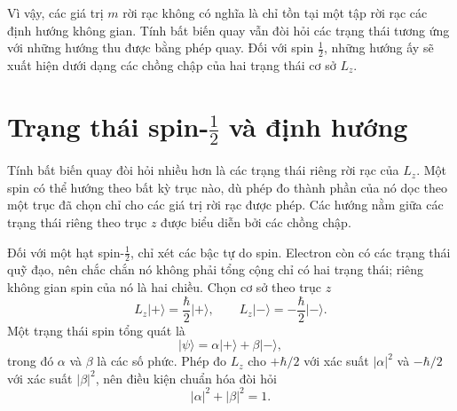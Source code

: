 \begin{classroomqa}
\end{classroomqa}

Vì vậy, các giá trị \(m\) rời rạc không có nghĩa là chỉ tồn tại một tập rời rạc các định hướng không gian. Tính bất biến quay vẫn đòi hỏi các trạng thái tương ứng với những hướng thu được bằng phép quay. Đối với spin \(\tfrac12\), những hướng ấy sẽ xuất hiện dưới dạng các chồng chập của hai trạng thái cơ sở \(L_z\).

\section{Trạng thái spin-\texorpdfstring{\(\tfrac12\)}{1/2} và định hướng}

Tính bất biến quay đòi hỏi nhiều hơn là các trạng thái riêng rời rạc của \(L_z\). Một spin có thể hướng theo bất kỳ trục nào, dù phép đo thành phần của nó dọc theo một trục đã chọn chỉ cho các giá trị rời rạc được phép. Các hướng nằm giữa các trạng thái riêng theo trục \(z\) được biểu diễn bởi các chồng chập.

Đối với một hạt spin-\(\tfrac12\), chỉ xét các bậc tự do spin. Electron còn có các trạng thái quỹ đạo, nên chắc chắn nó không phải tổng cộng chỉ có hai trạng thái; riêng không gian spin của nó là hai chiều. Chọn cơ sở theo trục \(z\)
\begin{equation}
L_z\lvert+\rangle=\frac{\hbar}{2}\lvert+\rangle,
\qquad
L_z\lvert-\rangle=-\frac{\hbar}{2}\lvert-\rangle.
\end{equation}
Một trạng thái spin tổng quát là
\begin{equation}
\lvert\psi\rangle
=
\alpha\lvert+\rangle+\beta\lvert-\rangle,
\end{equation}
trong đó \(\alpha\) và \(\beta\) là các số phức. Phép đo \(L_z\) cho \(+\hbar/2\) với xác suất \(|\alpha|^2\) và \(-\hbar/2\) với xác suất \(|\beta|^2\), nên điều kiện chuẩn hóa đòi hỏi
\begin{equation}
|\alpha|^2+|\beta|^2=1.
\end{equation}

